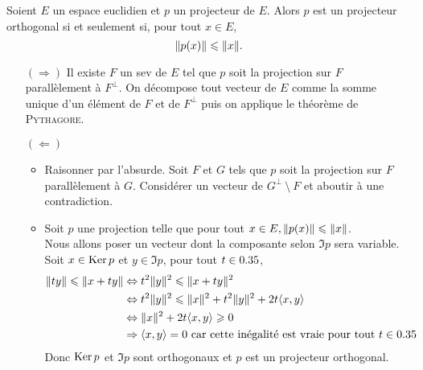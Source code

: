 \begin{prop}{}
    Soient $E$ un espace euclidien et $p$ un projecteur de $E$. Alors $p$ est un projecteur orthogonal si et seulement si, pour tout $x \in E$,
    $$\Vert p(x) \Vert \leqslant \Vert x \Vert.$$
\end{prop}

\begin{preuve}
    \begin{itemize}
        \item[$(\Rightarrow)$] Il existe $F$ un sev de $E$ tel que $p$ soit la projection sur $F$ parallèlement à $F^\perp$. On décompose tout vecteur de $E$ comme la somme unique d'un élément de $F$ et de $F^\perp$ puis on applique le théorème de \textsc{Pythagore}. 
        \item[$(\Leftarrow)$]
        \begin{itemize}
            \item {} Raisonner par l'absurde. Soit $F$ et $G$ tels que $p$ soit la projection sur $F$ parallèlement à $G$. Considérer un vecteur de $G^\perp\ \setminus\ F$ et aboutir à une contradiction.
            \item {} Soit $p$ une projection telle que pour tout $x \in E, \Vert p(x) \Vert \leqslant \Vert x \Vert$. \\
            Nous allons poser un vecteur dont la composante selon $\Im p$ sera variable.
            Soit $x \in \mathrm{Ker}\, p$ et $y \in \Im p$, pour tout $t \in 0.35$, 
            \begin{align*}
                \Vert ty \Vert \leqslant \Vert x + ty \Vert &\Leftrightarrow t^2 \Vert y \Vert^2 \leqslant \Vert x+ty \Vert^2 \\
                &\Leftrightarrow t^2 \Vert y \Vert^2 \leqslant \Vert x \Vert^2 + t^2 \Vert y \Vert^2 + 2t \langle x, y \rangle \\
                &\Leftrightarrow \Vert x \Vert^2 + 2t \langle x, y \rangle \geqslant 0 \\
                &\Rightarrow \langle x, y \rangle = 0 \text{ car cette inégalité est vraie pour tout } t \in 0.35
            \end{align*}
            Donc $\mathrm{Ker}\, p$ et $\Im p$ sont orthogonaux et $p$ est un projecteur orthogonal.
        \end{itemize}
    \end{itemize}
\end{preuve}

